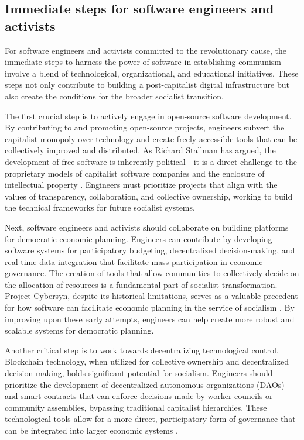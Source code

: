 \begin{refsection}
\subsection{Immediate steps for software engineers and activists}

For software engineers and activists committed to the revolutionary cause, the immediate steps to harness the power of software in establishing communism involve a blend of technological, organizational, and educational initiatives. These steps not only contribute to building a post-capitalist digital infrastructure but also create the conditions for the broader socialist transition.

The first crucial step is to actively engage in open-source software development. By contributing to and promoting open-source projects, engineers subvert the capitalist monopoly over technology and create freely accessible tools that can be collectively improved and distributed. As Richard Stallman has argued, the development of free software is inherently political—it is a direct challenge to the proprietary models of capitalist software companies and the enclosure of intellectual property \cite[pp.~21-23]{stallman2015}. Engineers must prioritize projects that align with the values of transparency, collaboration, and collective ownership, working to build the technical frameworks for future socialist systems.

Next, software engineers and activists should collaborate on building platforms for democratic economic planning. Engineers can contribute by developing software systems for participatory budgeting, decentralized decision-making, and real-time data integration that facilitate mass participation in economic governance. The creation of tools that allow communities to collectively decide on the allocation of resources is a fundamental part of socialist transformation. Project Cybersyn, despite its historical limitations, serves as a valuable precedent for how software can facilitate economic planning in the service of socialism \cite[pp.~234-236]{medina2011}. By improving upon these early attempts, engineers can help create more robust and scalable systems for democratic planning.

Another critical step is to work towards decentralizing technological control. Blockchain technology, when utilized for collective ownership and decentralized decision-making, holds significant potential for socialism. Engineers should prioritize the development of decentralized autonomous organizations (DAOs) and smart contracts that can enforce decisions made by worker councils or community assemblies, bypassing traditional capitalist hierarchies. These technological tools allow for a more direct, participatory form of governance that can be integrated into larger economic systems \cite[pp.~18-21]{wright2018}.


\end{refsection}
